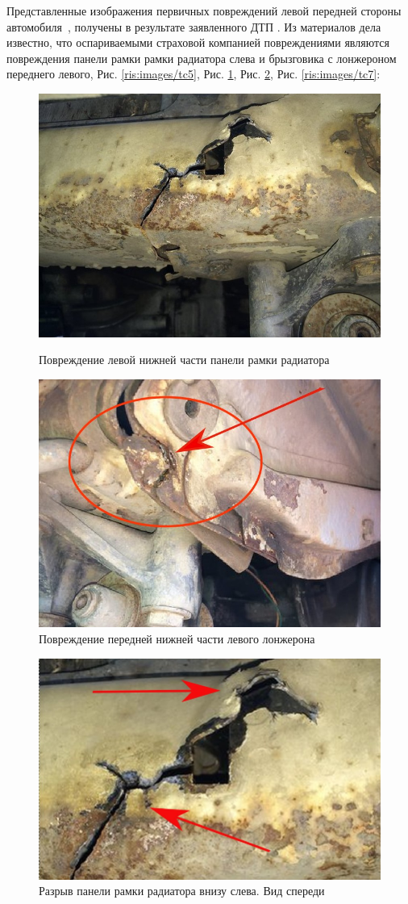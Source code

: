 Представленные  изображения первичных повреждений левой передней стороны автомобиля \,,  получены в результате заявленного ДТП .  Из материалов дела известно, что оспариваемыми  страховой компанией повреждениями являются повреждения    панели рамки рамки радиатора слева и  брызговика с лонжероном переднего левого, Рис. \ref{ris:images/tc5}, Рис. \ref{ris:images/tc4}, Рис. \ref{ris:images/tc6}, Рис. \ref{ris:images/tc7}:


  \begin{figure}[h]\centering
  	\parbox[t]{0.49\textwidth}
  	{\centering
  		\includegraphics[width=.49\textwidth]{images/tc5}
  		\caption{\footnotesize {Повреждение левой нижней части панели рамки радиатора  }}
  		\label{ris:images/tc5}}
  	\hfil \hfil
  	\parbox[t]{0.49\textwidth}
  	{\centering
  		\includegraphics[width=.49\textwidth]{images/tc4}
  		\caption{\footnotesize {Повреждение передней нижней части левого лонжерона}}
  		\label{ris:images/tc4}}
  \end{figure}

\begin{figure}[h]
	\centering
	\includegraphics[width=0.98\linewidth]{images/tc6}
	\caption{{\footnotesize {Разрыв панели рамки радиатора внизу слева. Вид спереди}}}
	\label{ris:images/tc6}
\end{figure}
\pagebreak

